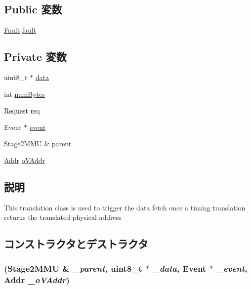 \subsection*{Public 変数}
\begin{DoxyCompactItemize}
\item 
\hyperlink{classRefCountingPtr}{Fault} \hyperlink{classArmISA_1_1Stage2MMU_1_1Stage2Translation_a68714ceb74c60ea7ef5dec335bb6c5d7}{fault}
\end{DoxyCompactItemize}
\subsection*{Private 変数}
\begin{DoxyCompactItemize}
\item 
uint8\_\-t $\ast$ \hyperlink{classArmISA_1_1Stage2MMU_1_1Stage2Translation_abe222f6d3581e7920dcad5306cc906a8}{data}
\item 
int \hyperlink{classArmISA_1_1Stage2MMU_1_1Stage2Translation_ad741d06221ef9f2ad307bffc9c9f4077}{numBytes}
\item 
\hyperlink{classRequest}{Request} \hyperlink{classArmISA_1_1Stage2MMU_1_1Stage2Translation_a76fdf11ae9d2e0af47b6362edcc4aaef}{req}
\item 
Event $\ast$ \hyperlink{classArmISA_1_1Stage2MMU_1_1Stage2Translation_a765488c8f26c7f8713d5245212dcae01}{event}
\item 
\hyperlink{classArmISA_1_1Stage2MMU}{Stage2MMU} \& \hyperlink{classArmISA_1_1Stage2MMU_1_1Stage2Translation_a61a3813700dc41c57c3a8a1c5fa32d15}{parent}
\item 
\hyperlink{classm5_1_1params_1_1Addr}{Addr} \hyperlink{classArmISA_1_1Stage2MMU_1_1Stage2Translation_a149cd9069ec9b6bd746ad320e99ff69d}{oVAddr}
\end{DoxyCompactItemize}


\subsection{説明}
This translation class is used to trigger the data fetch once a timing translation returns the translated physical address 

\subsection{コンストラクタとデストラクタ}
\hypertarget{classArmISA_1_1Stage2MMU_1_1Stage2Translation_adf800121ce2b6492781f7252444b8eff}{
\subsubsection[{Stage2Translation}]{ ({\bf Stage2MMU} \& {\em \_\-parent}, \/  uint8\_\-t $\ast$ {\em \_\-data}, \/  Event $\ast$ {\em \_\-event}, \/  {\bf Addr} {\em \_\-oVAddr})}}
\label{classArmISA_1_1Stage2MMU_1_1Stage2Translation_adf800121ce2b6492781f7252444b8eff}



